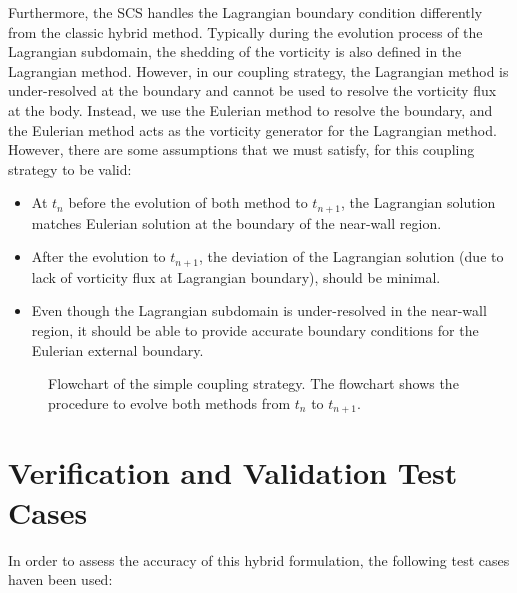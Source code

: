 Furthermore, the SCS handles the Lagrangian boundary condition differently from the classic hybrid method. Typically during the evolution process of the Lagrangian subdomain, the shedding of the vorticity is also defined in the Lagrangian method. However, in our coupling strategy, the Lagrangian method is under-resolved at the boundary and cannot be used to resolve the vorticity flux at the body. Instead, we use the Eulerian method to resolve the boundary, and the Eulerian method acts as the vorticity generator for the Lagrangian method. However, there are some assumptions that we must satisfy, for this coupling strategy to be valid:

	\begin{itemize}
	\item At $t_n$ before the evolution of both method to $t_{n+1}$, the Lagrangian solution matches Eulerian solution at the boundary of the near-wall region.
	\item After the evolution to $t_{n+1}$, the deviation of the Lagrangian solution (due to lack of vorticity flux at Lagrangian boundary), should be minimal.
	\item Even though the Lagrangian subdomain is under-resolved in the near-wall region, it should be able to provide accurate boundary conditions for the Eulerian external boundary.
	\end{itemize}
	
	\begin{figure}[!t]
		\centering
		\caption{Flowchart of the simple coupling strategy. The flowchart shows the procedure to evolve both methods from $t_n$ to $t_{n+1}$.}
		\label{fig:flowchart_simpleCoupling}
	\end{figure}

\section{Verification and Validation Test Cases}
\label{sec:vavtc}
In order to assess the accuracy of this hybrid formulation, the following test cases haven been used:

